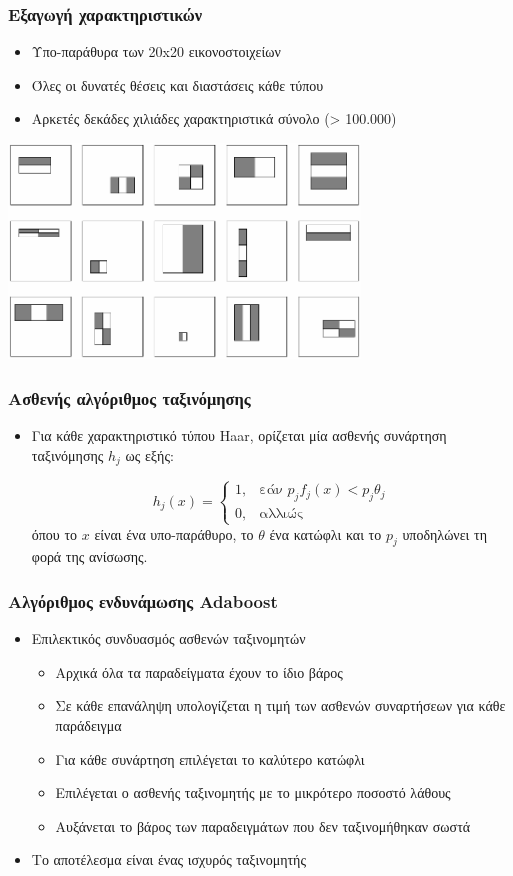 \documentclass{beamer}
\begin{document}
\begin{frame}
\frametitle{Εξαγωγή χαρακτηριστικών}
\begin{itemize}
\item Υπο-παράθυρα των 20x20 εικονοστοιχείων
\item Όλες οι δυνατές θέσεις και διαστάσεις κάθε τύπου
\item Αρκετές δεκάδες χιλιάδες χαρακτηριστικά σύνολο (> 100.000)
\end{itemize}
\begin{center}
\includegraphics[width=0.7\textwidth]{images/features-in-subwindows}
\end{center}
\end{frame}

\begin{frame}
\frametitle{Ασθενής αλγόριθμος ταξινόμησης}
\begin{itemize}
\item Για κάθε χαρακτηριστικό τύπου Haar, ορίζεται μία ασθενής συνάρτηση
ταξινόμησης $h_j$ ως εξής:

\begin{equation*}
h_j(x) = \begin{cases}
	1, & \mbox{εάν } p_jf_j(x) < p_j\theta_j \\
	0, & \mbox{αλλιώς}
\end{cases}
\end{equation*}
όπου το $x$ είναι ένα υπο-παράθυρο, το $\theta$ ένα κατώφλι και το $p_j$
υποδηλώνει τη φορά της ανίσωσης.
\end{itemize}
\end{frame}

\begin{frame}
\frametitle{Αλγόριθμος ενδυνάμωσης Adaboost}
\begin{itemize}
\item Επιλεκτικός συνδυασμός ασθενών ταξινομητών
\begin{itemize}
\item Αρχικά όλα τα παραδείγματα έχουν το ίδιο βάρος
\item Σε κάθε επανάληψη υπολογίζεται η τιμή των ασθενών συναρτήσεων για κάθε
παράδειγμα
\item Για κάθε συνάρτηση επιλέγεται το καλύτερο κατώφλι
\item Επιλέγεται ο ασθενής ταξινομητής με το μικρότερο ποσοστό λάθους
\item Αυξάνεται το βάρος των παραδειγμάτων που δεν ταξινομήθηκαν σωστά
\end{itemize}
\item Το αποτέλεσμα είναι ένας ισχυρός ταξινομητής
\end{itemize}
\end{frame}
\end{document}
